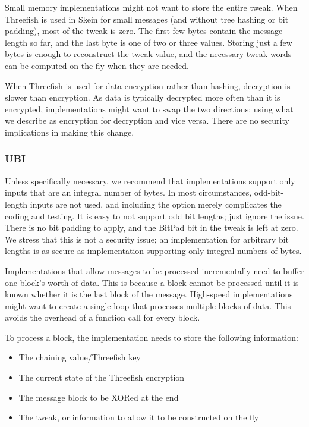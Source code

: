 \documentclass[11pt,twoside]{article}
\begin{document}
Small memory implementations might not want to store the entire tweak.  When Threefish is used in Skein for small messages (and without tree hashing or bit padding), most of the tweak is zero.  The first few bytes contain the message length so far, and the last byte is one of two or three values.  Storing just a few bytes is enough to reconstruct the tweak value, and the necessary tweak words can be computed on the fly when they are needed.

When Threefish is used for data encryption rather than hashing, decryption is slower than encryption.  As data is typically decrypted more often than it is encrypted, implementations might want to swap the two directions: using what we describe as encryption for decryption and vice versa.  There are no security implications in making this change.

\subsubsection{UBI}

Unless specifically necessary, we recommend that implementations support only inputs that are an integral number of bytes.  In most circumstances, odd-bit-length inputs are not used, and including the option merely complicates the coding and testing.  It is easy to not support odd bit lengths; just ignore the issue.  There is no bit padding to apply, and the BitPad bit in the tweak is left at zero. We stress that this is not a security issue; an implementation for arbitrary bit lengths is as secure as implementation supporting only integral numbers of bytes.

Implementations that allow messages to be processed incrementally need to buffer one block's worth of data.  This is because a block cannot be processed until it is known whether it is the last block of the message.  High-speed implementations might want to create a single loop that processes multiple blocks of data.  This avoids the overhead of a function call for every block.

To process a block, the implementation needs to store the following information:

\begin{itemize}
  \item The chaining value/Threefish key
  \item The current state of the Threefish encryption
  \item The message block to be XORed at the end
  \item The tweak, or information to allow it to be constructed on the fly
\end{itemize}
\end{document}
